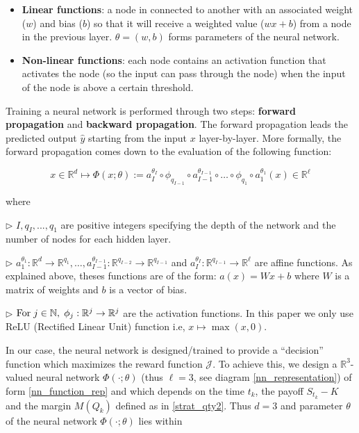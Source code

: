 \documentclass{article}
\newcommand{\q}[1]{``#1''}
\renewcommand{\q}[1]{``#1''}
\numberwithin{equation}{section}
\begin{document}
\begin{itemize}
    \item \textbf{Linear functions}: a node in connected to another with an associated weight ($w$) and bias ($b$) so that it will receive a weighted value ($wx+b$) from a node in the previous layer. $\theta = (w,b)$ forms parameters of the neural network.
    \item \textbf{Non-linear functions}: each node contains an activation function that activates the node (so the input can pass through the node) when the input of the node is above a certain threshold.
\end{itemize}



Training a neural network is performed through two steps: \textbf{forward propagation} and \textbf{backward propagation}. The forward propagation leads the predicted output  $\hat{y}$  starting from the input $x$ layer-by-layer. More formally, the forward propagation comes down to the evaluation of the following function:

\begin{equation}
    x \in \mathbb{R}^d \mapsto \Phi(x; \theta) := a_I^{\theta_I} \circ \phi_{q_{I-1}} \circ a_{I-1}^{\theta_{I-1}} \circ \ldots \circ \phi_{q_1} \circ a_1^{\theta_1}(x) \in \mathbb{R}^\ell
    \label{nn_function_rep}
\end{equation}

\noindent
where

\noindent

$\rhd$ $I, q_I, ..., q_1$ are positive integers specifying the depth of the network and the number of nodes for each hidden layer.

$\rhd$ $a_1^{\theta_1}:\mathbb{R}^d \to \mathbb{R}^{q_1},\ldots,a_{I-1}^{\theta_{I-1}}: \mathbb{R}^{q_{I-2}} \to \mathbb{R}^{q_{I-1}}$ and $a_I^{\theta_I}: \mathbb{R}^{q_{I-1}} \to \mathbb{R}^\ell$ are affine functions. As explained above, theses functions are of the form: $a(x) = Wx + b$ where $W$ is a matrix of weights and $b$ is a vector of bias.

$\rhd$ $\text{For} \hspace{0.1cm} j \in \mathbb{N}, \hspace{0.1cm} \phi_j : \mathbb{R}^j \to \mathbb{R}^j$ are the activation functions. In this paper we only use ReLU (Rectified Linear Unit) function i.e, $x \mapsto \max(x, 0)$.


\vspace{0.2cm}

In our case, the neural network is designed/trained to provide a \q{decision} function which maximizes the reward function $\mathcal{J}$. To achieve this, we design a $\mathbb{R}^3$-valued neural network $\Phi(\cdot; \theta)$ (thus $\ell = 3$, see diagram \ref{nn_representation}) of form \eqref{nn_function_rep} and which depends on the time $t_k$, the payoff $S_{t_k} - K$ and the margin $M(Q_k)$ defined as in \eqref{strat_qty2}. Thus $d = 3$ and parameter $\theta$ of the neural network $\Phi(\cdot; \theta)$  lies within
\end{document}

